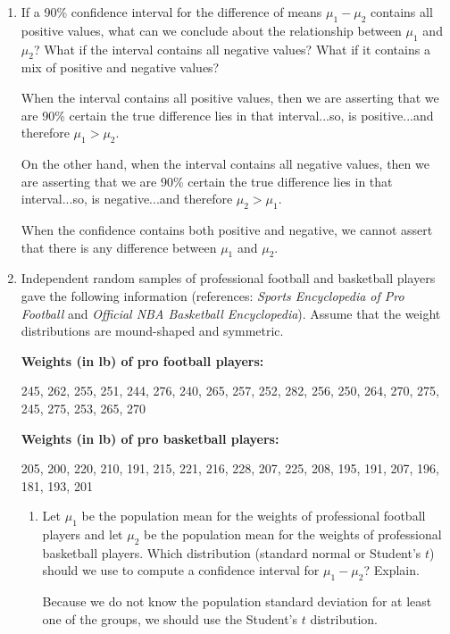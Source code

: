 \begin{enumerate}

\item If a 90\% confidence interval for the difference of means $\mu_1 -\mu_2$ contains all positive values, what can we conclude about the relationship between $\mu_1$ and $\mu_2$? What if the interval contains all negative values? What if it contains a mix of positive and negative values?  

{\answer When the interval contains all positive values, then we are asserting that we are 90\% certain the true difference lies in that interval...so, is positive...and therefore $\mu_1 > \mu_2$.  

On the other hand, when the interval contains all negative values, then we are asserting that we are 90\% certain the true difference lies in that interval...so, is negative...and therefore $\mu_2 > \mu_1$.  

When the confidence contains both positive and negative, we cannot assert that there is any difference between $\mu_1$ and $\mu_2$.
}  

\item Independent random samples of professional football and basketball players gave the following information (references: {\em Sports Encyclopedia of Pro Football} and {\em Official NBA Basketball Encyclopedia}). Assume that the weight distributions are mound-shaped and symmetric.
\begin{center}
\textbf{Weights (in lb) of pro football players:}  

245, 262, 255, 251, 244, 276, 240, 265, 257, 252, 282,  
256, 250, 264, 270, 275, 245, 275, 253, 265, 270  

\medskip

\textbf{Weights (in lb) of pro basketball players:}  

205, 200, 220, 210, 191, 215, 221, 216, 228, 207,  
225, 208, 195, 191, 207, 196, 181, 193, 201
\end{center}

	\begin{enumerate}
	\item Let $\mu_1$ be the population mean for the weights of professional football players and let $\mu_2$ be the population mean for the weights of professional basketball players. Which distribution (standard normal or Student's $t$) should we use to compute a confidence interval for $\mu_1 - \mu_2$? Explain.  
	
	{\answer Because we do not know the population standard deviation for at least one of the groups, we should use the Student's $t$ distribution.
	}  
	

\end{enumerate}
\end{enumerate}
